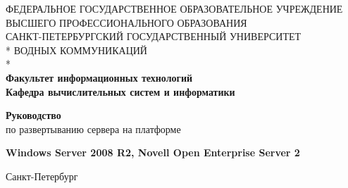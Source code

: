 {
\thispagestyle{empty}
\newpage

\begin{center}
ФЕДЕРАЛЬНОЕ ГОСУДАРСТВЕННОЕ ОБРАЗОВАТЕЛЬНОЕ УЧРЕЖДЕНИЕ ВЫСШЕГО ПРОФЕССИОНАЛЬНОГО ОБРАЗОВАНИЯ \\
\vspace{1cm}
САНКТ-ПЕТЕРБУРГСКИЙ ГОСУДАРСТВЕННЫЙ УНИВЕРСИТЕТ \\*
ВОДНЫХ КОММУНИКАЦИЙ \\*
\hrulefill\\
\textbf{Факультет информационных технологий \\
Кафедра вычислительных систем и информатики \\}
\end{center}

\vfill

\begin{center}
\textbf{Руководство}\\
\medskip
по развертыванию сервера на платформе\\
\medskip
\end{center}

\begin{center}
\textbf{Windows Server 2008 R2, Novell Open Enterprise Server 2}\\
\end{center}

\vfill
\vfill

\begin{center}
Санкт-Петербург\\\number\year
\end{center}
\clearpage

}